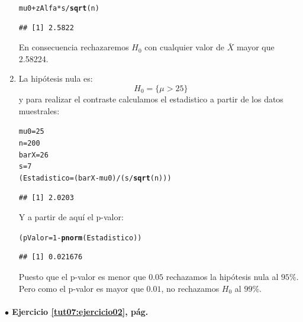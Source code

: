 \documentclass[10pt,a4paper]{article}\usepackage[]{graphicx}\usepackage[]{color}
\makeatletter
\newcommand{\hlnum}[1]{\textcolor[rgb]{0.686,0.059,0.569}{#1}}%
\newcommand{\hlopt}[1]{\textcolor[rgb]{0,0,0}{#1}}%
\newcommand{\hlstd}[1]{\textcolor[rgb]{0.345,0.345,0.345}{#1}}%
\newcommand{\hlkwb}[1]{\textcolor[rgb]{0.69,0.353,0.396}{#1}}%
\newcommand{\hlkwd}[1]{\textcolor[rgb]{0.737,0.353,0.396}{\textbf{#1}}}%
\newenvironment{kframe}{%
 \def\at@end@of@kframe{}%
 \ifinner\ifhmode%
  \def\at@end@of@kframe{\end{minipage}}%
  \begin{minipage}{\columnwidth}%
 \fi\fi%
 \def\FrameCommand##1{\hskip\@totalleftmargin \hskip-\fboxsep
 \colorbox{shadecolor}{##1}\hskip-\fboxsep
     \hskip-\linewidth \hskip-\@totalleftmargin \hskip\columnwidth}%
 \MakeFramed {\advance\hsize-\width
   \@totalleftmargin\z@ \linewidth\hsize
   \@setminipage}}%
 {\par\unskip\endMakeFramed%
 \at@end@of@kframe}
\newenvironment{knitrout}{}{} %
\newcounter {cont01}
\makeatother
\begin{document}
\begin{enumerate}
\begin{knitrout}
\begin{kframe}
\begin{alltt}
\hlstd{mu0} \hlopt{+}  \hlstd{zAlfa} \hlopt{*} \hlstd{s} \hlopt{/}\hlkwd{sqrt}\hlstd{(n)}
\end{alltt}
\begin{verbatim}
## [1] 2.5822
\end{verbatim}
\end{kframe}
\end{knitrout}
  En consecuencia rechazaremos $H_0$ con cualquier valor de $\bar X$ mayor que 2.58224.


  \item La hipótesis nula es:
  \[H_0=\{\mu > 25\}\]
  y para realizar el contraste calculamos el estadistico a partir de los datos muestrales:
\begin{knitrout}
\color{fgcolor}\begin{kframe}
\begin{alltt}
\hlstd{mu0} \hlkwb{=} \hlnum{25}
\hlstd{n} \hlkwb{=} \hlnum{200}
\hlstd{barX} \hlkwb{=} \hlnum{26}
\hlstd{s} \hlkwb{=} \hlnum{7}
\hlstd{(Estadistico} \hlkwb{=} \hlstd{(barX} \hlopt{-} \hlstd{mu0)}\hlopt{/}\hlstd{(s} \hlopt{/} \hlkwd{sqrt}\hlstd{(n)))}
\end{alltt}
\begin{verbatim}
## [1] 2.0203
\end{verbatim}
\end{kframe}
\end{knitrout}
  Y a partir de aquí el p-valor:
\begin{knitrout}
\color{fgcolor}\begin{kframe}
\begin{alltt}
\hlstd{(pValor} \hlkwb{=} \hlnum{1} \hlopt{-} \hlkwd{pnorm}\hlstd{(Estadistico))}
\end{alltt}
\begin{verbatim}
## [1] 0.021676
\end{verbatim}
\end{kframe}
\end{knitrout}
  Puesto que el p-valor es menor que $0.05$ rechazamos la hipótesis nula al $95\%$. Pero como el p-valor es mayor que $0.01$, no rechazamos $H_0$ al $99\%$.


\end{enumerate}



\paragraph{\bf $\bullet$ Ejercicio \ref{tut07:ejercicio02}, pág. \pageref{tut07:ejercicio02}}
\label{tut07:ejercicio02:sol}\quad\\
\end{document}
